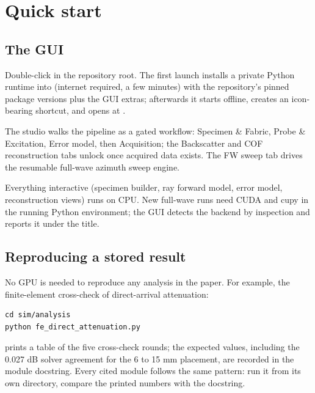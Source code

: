 \section{Quick start}

\subsection{The GUI}

Double-click  in the repository root. The
first launch installs a private Python runtime into 
(internet required, a few minutes) with the repository's pinned
package versions plus the GUI extras; afterwards it starts offline,
creates an icon-bearing shortcut, and opens at
.

The studio walks the pipeline as a gated workflow: Specimen \&
Fabric, Probe \& Excitation, Error model, then Acquisition; the
Backscatter and COF reconstruction tabs unlock once acquired data
exists. The FW sweep tab drives the resumable full-wave azimuth sweep
engine.

Everything interactive (specimen builder, ray forward model, error
model, reconstruction views) runs on CPU. New full-wave runs need
CUDA and cupy in the running Python environment; the GUI detects the
backend by inspection and reports it under the title.

\subsection{Reproducing a stored result}

No GPU is needed to reproduce any analysis in the paper. For example,
the finite-element cross-check of direct-arrival attenuation:

\begin{lstlisting}
cd sim/analysis
python fe_direct_attenuation.py
\end{lstlisting}

prints a table of the five cross-check rounds; the expected values,
including the 0.027 dB solver agreement for the 6 to 15 mm placement,
are recorded in the module docstring. Every cited module follows the
same pattern: run it from its own directory, compare the printed
numbers with the docstring.
